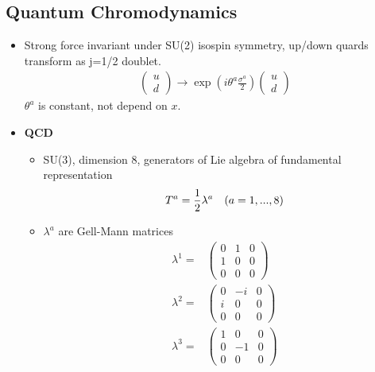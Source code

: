 \subsection{Quantum Chromodynamics}
\begin{itemize}
        \item Strong force invariant under SU(2) isospin symmetry, up/down quards transform as j=1/2 doublet. \cite{wells}
        \begin{equation}\begin{split}
        \begin{pmatrix}u\\d\end{pmatrix}\to\exp{\left(i\theta^a\frac{\sigma^a}{2}\right)}\begin{pmatrix}u\\d\end{pmatrix}
        \end{split}\end{equation}
        $\theta^a$ is constant, not depend on $x$.
    \item \textbf{QCD} \cite{wells}
    \begin{itemize}
        \item SU(3), dimension 8, generators of Lie algebra of fundamental representation \cite{wells}
        \begin{equation}\begin{split}
        T^a=\frac{1}{2}\lambda^a\quad\text(a=1,...,8)
        \end{split}\end{equation}
        \item $\lambda^a$ are Gell-Mann matrices \cite{wells}
        \begin{equation}\begin{split}
        \lambda^1=&\begin{pmatrix}0&1&0\\ 1&0&0\\ 0&0&0\end{pmatrix} \\
        \lambda^2=&\begin{pmatrix}0&-i&0\\ i&0&0\\ 0&0&0\end{pmatrix} \\
        \lambda^3=&\begin{pmatrix}1&0&0\\ 0&-1&0\\ 0&0&0\end{pmatrix} \\

\end{split}
\end{equation}
\end{itemize}
\end{itemize}
